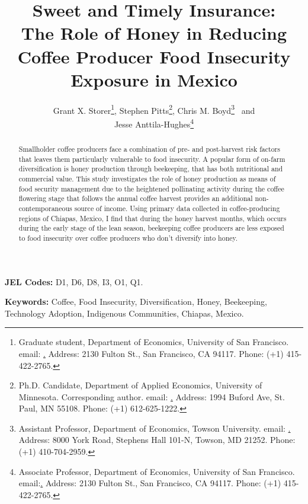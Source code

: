 \begin{titlepage}

\title{Sweet and Timely Insurance: \\
The Role of Honey in Reducing Coffee Producer Food
Insecurity Exposure in Mexico}
\author{Grant X. Storer\thanks{Graduate student, Department of Economics, University of San Francisco. email: \protect\href{gxstorer@usfca.edu}. Address: 2130 Fulton St., San Francisco, CA 94117. Phone: (+1) 415-422-2765.}, Stephen Pitts\thanks{Ph.D. Candidate, Department of Applied Economics, University of Minnesota. Corresponding author. email: \protect\href{pitts071@umn.edu)}. Address: 1994 Buford Ave, St. Paul, MN 55108. Phone: (+1) 612-625-1222.}, Chris M. Boyd\thanks{Assistant Professor, Department of Economics, Towson University. email: \protect\href{cboydleon@towson.edu}. Address: 8000 York Road, Stephens Hall 101-N, Towson, MD 21252. Phone: (+1) 410-704-2959.} \ and\\ Jesse Anttila-Hughes\thanks{Associate Professor, Department of Economics, University of San Francisco. email:\protect\href{jkanttilahughes@usfca.edu}. Address: 2130 Fulton St., San Francisco, CA 94117. Phone: (+1) 415-422-2765.}}

\maketitle

\begin{abstract}
Smallholder coffee producers face a combination of pre- and post-harvest risk factors
that leaves them particularly vulnerable to food insecurity. A popular form of on-farm
diversification is honey production through beekeeping, that has both nutritional and
commercial value. This study investigates the role of honey production as means of food
security management due to the heightened pollinating activity during the coffee flowering
stage that follows the annual coffee harvest provides an additional non-contemporaneous
source of income. Using primary data collected in coffee-producing regions of Chiapas,
Mexico, I find that during the honey harvest months, which occurs during the early stage of
the lean season, beekeeping coffee producers are less exposed to food insecurity over coffee
producers who don’t diversify into honey. 

\end{abstract}

\vspace{1cm} 
\textbf{\small{}JEL Codes:}{\small{} D1, D6, D8, I3, O1, Q1.}{\small\par}

\textbf{\small{}Keywords:}{\small{} Coffee, Food Insecurity, Diversification, Honey, Beekeeping, Technology Adoption, Indigenous Communities, Chiapas, Mexico.}{\small\par}

\thispagestyle{empty} 

\end{titlepage}